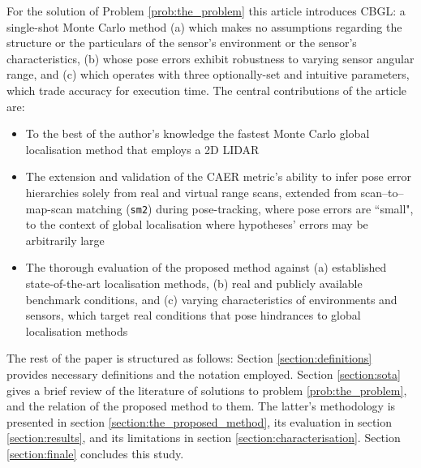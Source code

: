 For the solution of Problem \ref{prob:the_problem} this article introduces
CBGL: a single-shot Monte Carlo method
(a) which makes no assumptions regarding the structure or the particulars of the
sensor's environment or the sensor's characteristics,
(b) whose pose errors exhibit robustness to varying sensor angular range, and
(c) which operates with three optionally-set and intuitive parameters, which
trade accuracy for execution time.
The central contributions of the article are:
\begin{itemize}
  \item To the best of the author's knowledge the fastest Monte Carlo global
        localisation method that employs a 2D LIDAR
  \item The extension and validation of the CAER metric's ability to infer
        pose error hierarchies solely from real and virtual range scans,
        extended from scan--to--map-scan matching (\texttt{sm2}) during
        pose-tracking, where pose errors are ``small", to the context of
        global localisation where hypotheses' errors may be arbitrarily large
  \item The thorough evaluation of the proposed method against (a) established
        state-of-the-art localisation methods, (b) real and publicly available
        benchmark conditions, and (c) varying characteristics of environments
        and sensors, which target real conditions that pose hindrances to global
        localisation methods
\end{itemize}


The rest of the paper is structured as follows: Section
\ref{section:definitions} provides necessary definitions and the notation
employed. Section \ref{section:sota} gives a brief review of the
literature of solutions to problem \ref{prob:the_problem}, and the relation of
the proposed method to them.  The latter's methodology is presented in section
\ref{section:the_proposed_method}, its evaluation in section
\ref{section:results}, and its limitations in section
\ref{section:characterisation}. Section \ref{section:finale} concludes this
study.
